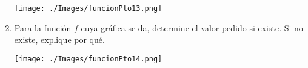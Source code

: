 \documentclass[10pt,twoside]{article}
\begin{document}
\begin{enumerate}
\begin{minipage}{.6\textwidth}
\begin{enumerate}
 \end{enumerate}
\end{minipage}
\begin{minipage}{.35\textwidth}
 \texttt{[image: ./Images/funcionPto13.png]}
\end{minipage}
\item Para la función $f$ cuya gráfica se da, determine el valor pedido si existe. Si no existe, explique por qué.
 \begin{minipage}{.6\textwidth}
 \begin{enumerate}
  \end{enumerate}
  \end{minipage}
  \begin{minipage}{.35\textwidth}
 \texttt{[image: ./Images/funcionPto14.png]}
\end{minipage}




\end{enumerate}
\end{document}
